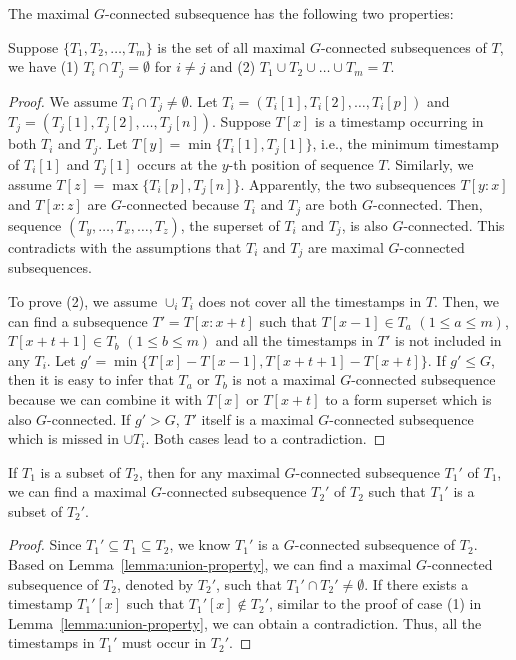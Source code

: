 The maximal $G$-connected subsequence has the following two properties:
\begin{lemma}\label{lemma:union-property}
Suppose $\{T_1,T_2,\ldots,T_m\}$ is the set of all maximal $G$-connected subsequences of $T$, we have (1) $T_i\cap T_j=\emptyset$ for $i\neq j$ and (2) $T_1\cup T_2\cup\ldots\cup T_m=T$.
\end{lemma}
\begin{proof}
We assume $T_i\cap T_j\neq \emptyset$. Let $T_i=(T_i[1], T_i[2],\ldots,T_i[p])$ and $T_j= (T_j[1], T_j[2],\ldots,T_j[n])$. Suppose $T[x]$ is a timestamp occurring in both $T_i$ and $T_j$. Let $T[y]=\min\{T_i[1],T_j[1]\}$, i.e., the minimum timestamp of $T_i[1]$ and $T_j[1]$ occurs at the $y$-th position of sequence $T$. Similarly, we assume $T[z]=\max\{T_i[p], T_j[n]\}$. Apparently, the two subsequences $T[y:x]$ and $T[x:z]$ are $G$-connected because $T_i$ and $T_j$ are both $G$-connected. Then, sequence $(T_y,\ldots,T_x,\ldots,T_z)$, the superset of $T_i$ and $T_j$, is also $G$-connected. This contradicts with the assumptions that $T_i$ and $T_j$ are maximal $G$-connected subsequences. 




To prove (2), we assume $\cup_i T_i$ does not cover all the timestamps in $T$. Then, we can find a subsequence $T'=T[x:x+t]$ such that $T[x-1]\in T_a$ $(1\leq a\leq m)$, $T[x+t+1]\in T_b$ $(1\leq b\leq m)$ and all the timestamps in $T'$ is not included in any $T_i$. Let $g'=\min\{T[x]-T[x-1], T[x+t+1]-T[x+t]\}$. If $g'\leq G$, then it is easy to infer that $T_a$ or $T_b$ is not a maximal $G$-connected subsequence because we can combine it with $T[x]$ or $T[x+t]$  to a form superset which is also $G$-connected. If $g'>G$, $T'$ itself is a maximal $G$-connected subsequence which is missed in $\cup T_i$. Both cases lead to a contradiction.
\end{proof}




\begin{lemma}\label{lemma:subset-property}
If $T_1$ is a subset of $T_2$, then for any maximal $G$-connected subsequence $T_1'$ of $T_1$, we can find a maximal $G$-connected subsequence $T_2'$ of $T_2$ such that $T_1'$ is a subset of $T_2'$.
\end{lemma}
\begin{proof}
Since $T_1' \subseteq T_1 \subseteq T_2 $, we know $T_1'$ is a $G$-connected subsequence of $T_2$. Based on Lemma~\ref{lemma:union-property}, we can find a maximal $G$-connected subsequence of $T_2$, denoted by $T_2'$, such that $T_1'\cap T_2'\neq \emptyset$. If there exists a timestamp $T_1'[x]$ such that $T_1'[x]\notin T_2'$, similar to the proof of case (1) in Lemma~\ref{lemma:union-property}, we can obtain a contradiction. Thus, all the timestamps in $T_1'$ must occur in $T_2'$.
\end{proof}

